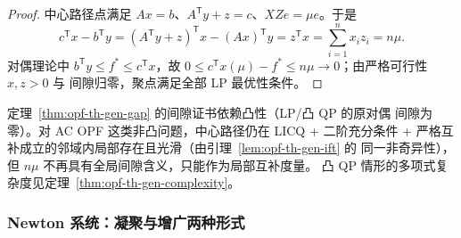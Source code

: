 \begin{proof}
中心路径点满足 $Ax=b$、$A^{\mathsf T}y+z=c$、$XZe=\mu e$。于是
\begin{equation}
c^{\mathsf T}x-b^{\mathsf T}y
=(A^{\mathsf T}y+z)^{\mathsf T}x-(Ax)^{\mathsf T}y
=z^{\mathsf T}x=\sum_{i=1}^n x_iz_i=n\mu .
\end{equation}
对偶理论中 $b^{\mathsf T}y\le f^*\le c^{\mathsf T}x$，故
$0\le c^{\mathsf T}x(\mu)-f^*\le n\mu\to0$；由严格可行性 $x,z>0$ 与
间隙归零，聚点满足全部 LP 最优性条件。
\end{proof}

\begin{remark}\label{rem:opf-th-gen-nlp-caveat}
定理~\ref{thm:opf-th-gen-gap} 的间隙证书依赖凸性（LP/凸 QP 的原对偶
间隙为零）。对 AC OPF 这类非凸问题，中心路径仍在 LICQ + 二阶充分条件 +
严格互补成立的邻域内局部存在且光滑（由引理~\ref{lem:opf-th-gen-ift} 的
同一非奇异性），但 $n\mu$ 不再具有全局间隙含义，只能作为局部互补度量。
凸 QP 情形的多项式复杂度见定理~\ref{thm:opf-th-gen-complexity}。
\end{remark}

\subsubsection{Newton 系统：凝聚与增广两种形式}

